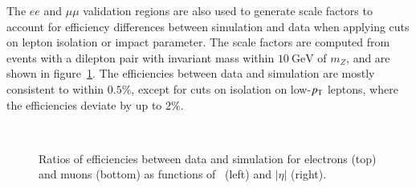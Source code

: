 The $ee$ and $\mu\mu$ validation regions are also used to generate scale factors to account for efficiency
differences between simulation and data when applying cuts on lepton isolation or impact parameter. The scale factors are computed from events with a dilepton pair with invariant mass within $\SI{10}{\giga\electronvolt}$ of $m_Z$, and are shown in figure~\ref{fig:model-independent-lepton-SFs}. The efficiencies between data and simulation are mostly consistent to within $0.5\%$, except for cuts on isolation on low-$p_{\text{T}}$ leptons, where the efficiencies deviate by up to $2\%$. 

\begin{figure}[htbp]
  \hfill
   \\
  \hfill
  \caption{Ratios of efficiencies between data and simulation for electrons (top) and muons (bottom) as functions of \pt\ (left) and $|\eta|$ (right).}
  \label{fig:model-independent-lepton-SFs}
\end{figure}


